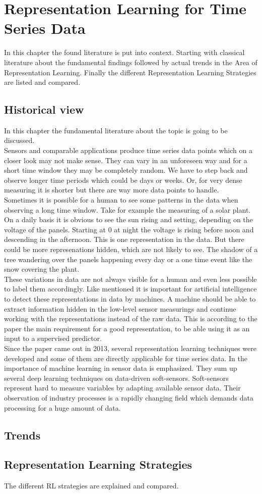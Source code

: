 \chapter{Representation Learning for Time Series Data}
In this chapter the found literature is put into context. Starting with classical literature about the fundamental findings followed by actual trends in the Area of Representation Learning. Finally the different Representation Learning Strategies are listed and compared.
\section{Historical view}
In this chapter the fundamental literature about the topic is going to be discussed. \\
Sensors and comparable applications produce time series data points which on a closer look may not make sense. They can vary in an unforeseen way and for a short time window they may be completely random. We have to step back and observe longer time periods which could be days or weeks. Or, for very dense measuring it is shorter but there are way more data points to handle.\\
Sometimes it is possible for a human to see some patterns in the data when observing a long time window. Take for example the measuring of a solar plant. On a daily basis it is obvious to see the sun rising and setting, depending on the voltage of the panels. Starting at 0 at night the voltage is rising before noon and descending in the afternoon. This is one representation in the data. But there could be more represenations hidden, which are not likely to see. The shadow of a tree wandering over the panels happening every day or a one time event like the snow covering the plant. \\
These variations in data are not always visible for a human and even less possible to label them accordingly. Like \cite{bengio_representation_2013} mentioned it is important for artificial intelligence to detect these representations in data by machines. A machine should be able to extract information hidden in the low-level sensor measurings and continue working with the representations instead of the raw data. This is according to the paper the main requirement for a good representation, to be able using it as an input to a supervised predictor.\\
Since the paper came out in 2013, several representation learning techniques were developed and some of them are directly applicable for time series data. In \cite{sun_survey_2021} the importance of machine learning in sensor data is emphasized. They sum up several deep learning techniques on data-driven soft-sensors. Soft-sensors represent hard to measure variables by adapting available sensor data. Their observation of industry processes is a rapidly changing field which demands data processing for a huge amount of data.
\section{Trends}
\section{Representation Learning Strategies}
The different RL strategies are explained and compared.
